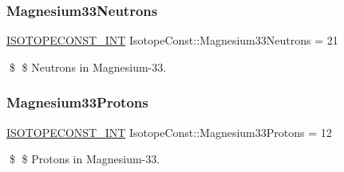 \subsubsection{\texorpdfstring{Magnesium33\+Neutrons}{Magnesium33Neutrons}}
{\footnotesize\ttfamily \mbox{\hyperlink{group___isotope_const-_macros_ga5f18360b3e99483a35c32d789e62621c}{I\+S\+O\+T\+O\+P\+E\+C\+O\+N\+S\+T\+\_\+\+I\+NT}} Isotope\+Const\+::\+Magnesium33\+Neutrons = 21}

\$ \$ Neutrons in Magnesium-\/33. \mbox{\label{group___isotope_const-_magnesium-_mg33_ga7f8fedfca69eb790b78e03fcbbf6dfa4}} 
\subsubsection{\texorpdfstring{Magnesium33\+Protons}{Magnesium33Protons}}
{\footnotesize\ttfamily \mbox{\hyperlink{group___isotope_const-_macros_ga5f18360b3e99483a35c32d789e62621c}{I\+S\+O\+T\+O\+P\+E\+C\+O\+N\+S\+T\+\_\+\+I\+NT}} Isotope\+Const\+::\+Magnesium33\+Protons = 12}

\$ \$ Protons in Magnesium-\/33. 